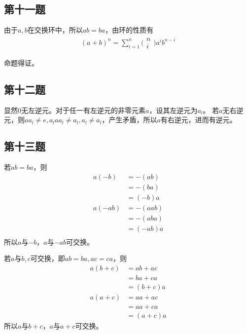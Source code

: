 \documentclass[12pt,onecolumn]{article}
\theoremstyle{plain}
\begin{document}
\subsection{第十一题}
\begin{proof*}
  由于$a, b$在交换环中，所以$ab = ba$，由环的性质有
  \begin{align*}
    {(a + b)}^{n} = \sum_{i = 1}^{n}\bigl( \begin{array}{c} n \\ i \end{array} \bigr) a^ib^{n-i}
  \end{align*}

  命题得证。
\end{proof*}

\subsection{第十二题}
\begin{proof*}
  显然$0$无左逆元。对于任一有左逆元的非零元素$a$，设其左逆元为$a_l$。
  若$a$无右逆元，则$aa_l \neq e, a_{l}aa_l \neq a_l, a_l \neq a_l$，产生矛盾，所以$a$有右逆元，进而有逆元。
\end{proof*}

\subsection{第十三题}
\begin{proof*}
  若$ab = ba$，则
  \begin{align*}
    a(-b) &= -(ab) \\
          &= -(ba) \\
          &= (-b)a \\
    a(-ab) &= -(aab) \\
          &= -(aba) \\
          &= (-ab)a \\
  \end{align*}
  所以$a$与$−b$，$a$与$−ab$可交换。

  若$a$与$b, c$可交换，即$ab = ba, ac = ca$，则
  \begin{align*}
    a(b + c) &= ab + ac \\
             &= ba + ca \\
             &= (b + c)a \\
    a(a + c) &= aa + ac \\
             &= aa + ca \\
             &= (a + c)a
  \end{align*}
  所以$a$与$b+c$，$a$与$a+c$可交换。
\end{proof*}
\end{document}
